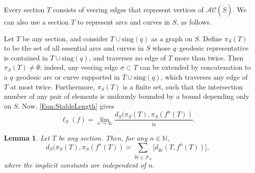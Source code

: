 \documentclass[11pt,letterpaper]{amsart}
\newcommand{\NN}[0]{\mathbb{N}}
\newcommand{\sing}{\mathrm{sing}}
\newcommand{\mc}{\mathcal}
\newcommand{\mr}{\mathring}
\newcommand{\psub}{\mr W}
\numberwithin{equation}{section}
\newtheorem{lemma}[theorem]{Lemma}
\theoremstyle{definition}
\newcommand{\AC}{\mathcal{AC}}
\begin{document}
Every section $T$ consists of veering edges that represent vertices of $\AC(\mr S)$. We can also
 use a section $T$ to represent arcs and curves in $S$, as follows.

Let $T$ be any section, and consider $T \cup \sing(q)$ as a graph on $S$. Define $\pi_S(T)$ to be the set of all essential arcs and curves in $S$ whose $q$--geodesic representative is contained in $T \cup \sing(q)$, and traverses no edge of $T$ more than twice. 
Then $\pi_S(T) \neq \emptyset$: indeed, any veering edge $\sigma \subset T$ can be extended by concatenation to a $q$--geodesic arc or curve supported in $T \cup \sing(q)$, which traverses any edge of $T$ at most twice.
Furthermore, $\pi_S(T)$
 is a finite set, such that the intersection number of any pair of elements is uniformly bounded by a bound depending only on $S$.
Now, \eqref{Eqn:StableLength} gives
\begin{equation}\label{Eqn:StableLengthRestate}
\ell_S(f) = \lim_{n \to \infty} \frac{ d_S ( \pi_S(T), \pi_S(f^n(T)) }{n}.
\end{equation}


\begin{lemma}\label{Lem:Shuffling2WholeSurf}
Let $T$ be any section. Then, for any $n \in \NN$,
\[
d_S ( \pi_S(T), \pi_S(f^n(T)) \asymp \sum_{\psub \in \mc F_S} \big[ d_{\psub}(T, f^n(T)) \big],
\]
where the implicit constants are independent of $n$.
\end{lemma}
\end{document}
